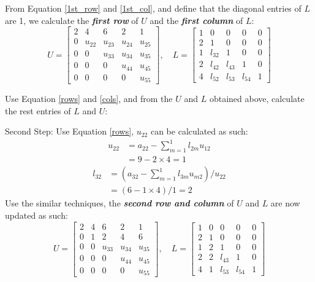 \documentclass[a4paper,titlepage]{article}
\begin{document}
			From Equation \ref{1st_row} and \ref{1st_col}, and define that the diagonal entries of $L$ are 1, we calculate the \textbf{\textit{first row}} of $U$ and the \textbf{\textit{first column}} of $L$:
			$$
			U = \begin{bmatrix}
				2 & 4 & 6 & 2 & 1\\
				0 & u_{22} & u_{23} & u_{24} & u_{25}\\
				0 & 0 & u_{33} & u_{34} & u_{35}\\
				0 & 0 & 0 & u_{44} & u_{45}\\
				0 & 0 & 0 & 0 & u_{55}
			\end{bmatrix}, \quad
			L = \begin{bmatrix}
				1 & 0 & 0 & 0 & 0\\
				2 & 1 & 0 & 0 & 0\\
				1 & l_{32} & 1 & 0 & 0\\
				2 & l_{42} & l_{43} & 1 & 0\\
				4 & l_{52} & l_{53} & l_{54} & 1
			\end{bmatrix}
			$$
			
			Use Equation \ref{rows} and \ref{cols}, and from the $U$ and $L$ obtained above, calculate the rest entries of $L$ and $U$:
			
			Second Step: Use Equation \ref{rows}, $u_{22}$ can be calculated as such:
			\begin{align*}
				u_{22} &= a_{22} - \sum_{m = 1}^{1}l_{2m}u_{12}\\
				&= 9 - 2\times4 = 1
			\end{align*}
			\begin{align*}
				l_{32} &= (a_{32} - \sum_{m=1}^{1}l_{3m}u_{m2})/u_{22}\\
				&= (6 - 1\times 4) / 1 = 2
			\end{align*}
			Use the similar techniques, the \textbf{\textit{second row and column}} of $U$ and $L$ are now updated as such:
			$$
				U = \begin{bmatrix}
					2 & 4 & 6 & 2 & 1\\
					0 & 1 & 2 & 4 & 6\\
					0 & 0 & u_{33} & u_{34} & u_{35}\\
					0 & 0 & 0 & u_{44} & u_{45}\\
					0 & 0 & 0 & 0 & u_{55}
				\end{bmatrix}, \quad
				L = \begin{bmatrix}
					1 & 0 & 0 & 0 & 0\\
					2 & 1 & 0 & 0 & 0\\
					1 & 2 & 1 & 0 & 0\\
					2 & 2 & l_{43} & 1 & 0\\
					4 & 1 & l_{53} & l_{54} & 1
				\end{bmatrix}
			$$
			
\end{document}
